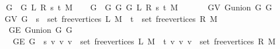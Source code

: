 \begin{isabellebody}
%
\isadelimproof
%
\endisadelimproof
%
\isatagproof
{}\isamarkupfalse%
\ {\isacharminus}{\kern0pt}\isanewline
\ \ \isamarkupfalse%
\ {\isacharquery}{\kern0pt}G{}\ {\isacharequal}{\kern0pt}\ {\isachardoublequoteopen}G{}\ L\ R\ s\ t\ M{\isachardoublequoteclose}\isanewline
\ \ \isamarkupfalse%
\ {\isacharquery}{\kern0pt}G{}\ {\isacharequal}{\kern0pt}\ {\isachardoublequoteopen}G{}\ G\ {\isacharparenleft}{\kern0pt}G{}\ L\ R\ s\ t\ M{\isacharparenright}{\kern0pt}{\isachardoublequoteclose}\isanewline
\ \ \isamarkupfalse%
\isanewline
\ \ \ \ {\isachardoublequoteopen}G{\isachardot}{\kern0pt}V\ {\isacharparenleft}{\kern0pt}G{\isachardot}{\kern0pt}union\ {\isacharquery}{\kern0pt}G{}\ {\isacharquery}{\kern0pt}G{}{\isacharparenright}{\kern0pt}\ {\isacharequal}{\kern0pt}\isanewline
\ \ \ \ \ G{\isachardot}{\kern0pt}V\ G\ {\isasymunion}\ {\isacharbraceleft}{\kern0pt}s{\isacharbraceright}{\kern0pt}\ {\isasymunion}\ set\ {\isacharparenleft}{\kern0pt}free{\isacharunderscore}{\kern0pt}vertices\ L\ M{\isacharparenright}{\kern0pt}\ {\isasymunion}\ {\isacharbraceleft}{\kern0pt}t{\isacharbraceright}{\kern0pt}\ {\isasymunion}\ set\ {\isacharparenleft}{\kern0pt}free{\isacharunderscore}{\kern0pt}vertices\ R\ M{\isacharparenright}{\kern0pt}{\isachardoublequoteclose}\isanewline
\ \ \isamarkupfalse%
\ {\isacharminus}{\kern0pt}\isanewline
\ \ \ \ \isamarkupfalse%
\isanewline
\ \ \ \ \ \ {\isachardoublequoteopen}G{\isachardot}{\kern0pt}E\ {\isacharparenleft}{\kern0pt}G{\isachardot}{\kern0pt}union\ {\isacharquery}{\kern0pt}G{}\ {\isacharquery}{\kern0pt}G{}{\isacharparenright}{\kern0pt}\ {\isacharequal}{\kern0pt}\isanewline
\ \ \ \ \ \ \ G{\isachardot}{\kern0pt}E\ G\ {\isasymunion}\ {\isacharbraceleft}{\kern0pt}{\isacharbraceleft}{\kern0pt}s{\isacharcomma}{\kern0pt}\ v{\isacharbraceright}{\kern0pt}\ {\isacharbar}{\kern0pt}v{\isachardot}{\kern0pt}\ v\ {\isasymin}\ set\ {\isacharparenleft}{\kern0pt}free{\isacharunderscore}{\kern0pt}vertices\ L\ M{\isacharparenright}{\kern0pt}{\isacharbraceright}{\kern0pt}\ {\isasymunion}\ {\isacharbraceleft}{\kern0pt}{\isacharbraceleft}{\kern0pt}t{\isacharcomma}{\kern0pt}\ v{\isacharbraceright}{\kern0pt}\ {\isacharbar}{\kern0pt}v{\isachardot}{\kern0pt}\ v\ {\isasymin}\ set\ {\isacharparenleft}{\kern0pt}free{\isacharunderscore}{\kern0pt}vertices\ R\ M{\isacharparenright}{\kern0pt}{\isacharbraceright}{\kern0pt}{\isachardoublequoteclose}\isanewline
\ \ \ \ \ \ \isamarkupfalse%

\end{isabellebody}
